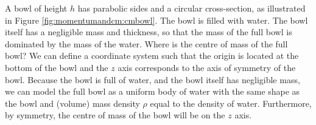 \begin{example}{
A bowl of height $h$ has parabolic sides and a circular cross-section, as illustrated in Figure \ref{fig:momentumandcm:cmbowl}. The bowl is filled with water. The bowl itself has a negligible mass and thickness, so that the mass of the full bowl is dominated by the mass of the water. Where is the centre of mass of the full bowl?}
We can define a coordinate system such that the origin is located at the bottom of the bowl and the $z$ axis corresponds to the axis of symmetry of the bowl. Because the bowl is full of water, and the bowl itself has negligible mass, we can model the full bowl as a uniform body of water with the same shape as the bowl and (volume) mass density $\rho$ equal to the density of water. Furthermore, by symmetry, the centre of mass of the bowl will be on the $z$ axis. 


\end{example}
